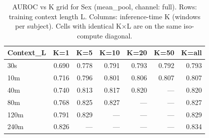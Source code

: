 \begin{table}[ht]
\centering
\caption{AUROC vs K grid for Sex (mean_pool, channel: full). Rows: training context length L. Columns: inference-time K (windows per subject). Cells with identical K×L are on the same iso-compute diagonal.}
\label{tab:kgrid_sex_binary_mean_pool_full}
\begin{tabular}{lrrrrrr}
\toprule
Context_L & K=1 & K=5 & K=10 & K=20 & K=50 & K=all \\
\midrule
30s & 0.690 & 0.778 & 0.791 & 0.793 & 0.792 & 0.793 \\
10m & 0.716 & 0.796 & 0.801 & 0.806 & 0.807 & 0.807 \\
40m & 0.740 & 0.813 & 0.817 & 0.820 & — & 0.820 \\
80m & 0.768 & 0.825 & 0.827 & — & — & 0.827 \\
120m & 0.791 & 0.829 & — & — & — & 0.829 \\
240m & 0.826 & — & — & — & — & 0.834 \\
\bottomrule
\end{tabular}
\end{table}
